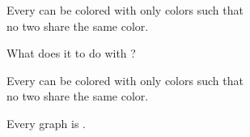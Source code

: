 \begin{frame}{}
  \begin{theorem}
    Every  can be colored with only  colors such that \\
    no two   share the same color.
  \end{theorem}

  \pause
  \vspace{0.50cm}
  \begin{center}
    What does it to do with ?
  \end{center}
\end{frame}

\begin{frame}{}
  \begin{theorem}
    Every  can be colored with only  colors such that \\
    no two   share the same color.
  \end{theorem}

  \pause

  \pause
  \begin{theorem}
    Every  graph is .
  \end{theorem}
\end{frame}
